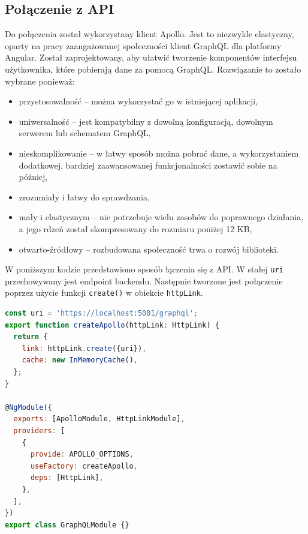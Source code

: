 \subsection{Połączenie z API}
Do połączenia został wykorzystany klient Apollo. Jest to niezwykle elastyczny, oparty na pracy zaangażowanej społeczności klient GraphQL dla platformy Angular.\cite{apollo} Został zaprojektowany, aby ułatwić tworzenie komponentów interfejsu użytkownika, które pobierają dane za pomocą GraphQL. Rozwiązanie to zostało wybrane ponieważ:
\begin{itemize}
    \item przystosowalność -- można wykorzystać go w istniejącej aplikacji,
    \item uniwersalność -- jest kompatybilny z dowolną konfiguracją, dowolnym serwerem lub schematem GraphQL,
    \item nieskomplikowanie -- w łatwy sposób można pobrać dane, a wykorzystaniem dodatkowej, bardziej zaawansowanej funkcjonalności zostawić sobie na później,
    \item zrozumiały i łatwy do sprawdzania,
    \item mały i elastycznym -- nie potrzebuje wielu zasobów do poprawnego działania, a jego rdzeń został skompresowany do rozmiaru poniżej 12 KB,
    \item otwarto-źródłowy -- rozbudowana społeczność trwa o rozwój biblioteki.
\end{itemize}


W poniższym kodzie przedstawiono sposób łączenia się z API. W stałej \texttt{uri} przechowywany jest endpoint backendu. Następnie tworzone jest połączenie poprzez użycie funkcji \texttt{create()} w obiekcie \texttt{httpLink}.
\begin{lstlisting}[language=JavaScript]
const uri = 'https://localhost:5001/graphql';
export function createApollo(httpLink: HttpLink) {
  return {
    link: httpLink.create({uri}),
    cache: new InMemoryCache(),
  };
}

@NgModule({
  exports: [ApolloModule, HttpLinkModule],
  providers: [
    {
      provide: APOLLO_OPTIONS,
      useFactory: createApollo,
      deps: [HttpLink],
    },
  ],
})
export class GraphQLModule {}
\end{lstlisting}

